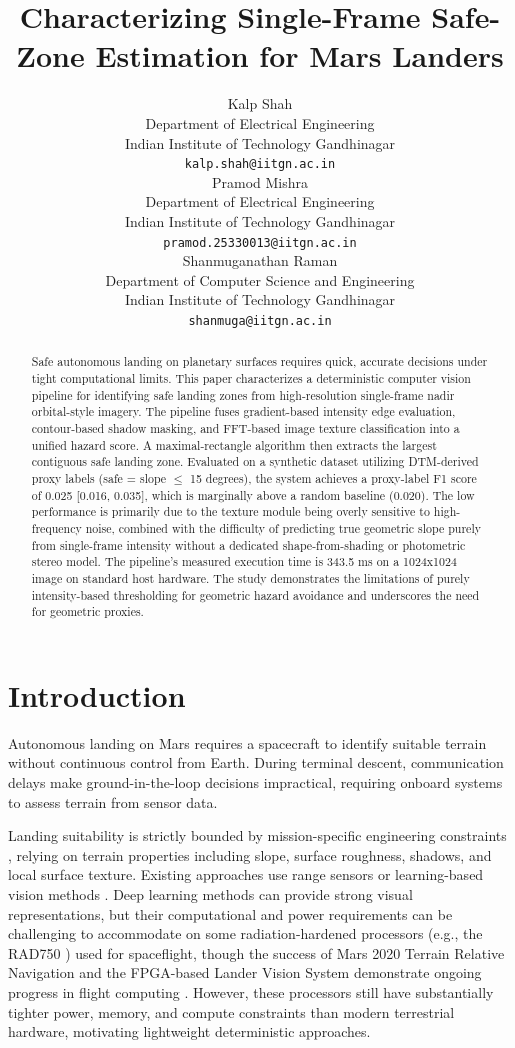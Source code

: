 \documentclass{article}
\title{Characterizing Single-Frame Safe-Zone Estimation for Mars Landers}
\author{
  Kalp Shah \\
  Department of Electrical Engineering \\
  Indian Institute of Technology Gandhinagar \\
  \texttt{kalp.shah@iitgn.ac.in} \\
   \And
  Pramod Mishra \\
  Department of Electrical Engineering \\
  Indian Institute of Technology Gandhinagar \\
  \texttt{pramod.25330013@iitgn.ac.in} \\
  \And
  Shanmuganathan Raman \\
  Department of Computer Science and Engineering \\
  Indian Institute of Technology Gandhinagar \\
  \texttt{shanmuga@iitgn.ac.in} \\
}
\begin{document}
\maketitle


\begin{abstract}
Safe autonomous landing on planetary surfaces requires quick, accurate decisions under tight computational limits. This paper characterizes a deterministic computer vision pipeline for identifying safe landing zones from high-resolution single-frame nadir orbital-style imagery. The pipeline fuses gradient-based intensity edge evaluation, contour-based shadow masking, and FFT-based image texture classification into a unified hazard score. A maximal-rectangle algorithm then extracts the largest contiguous safe landing zone. Evaluated on a synthetic dataset utilizing DTM-derived proxy labels (safe = slope $\le$ 15 degrees), the system achieves a proxy-label F1 score of 0.025 [0.016, 0.035], which is marginally above a random baseline (0.020). The low performance is primarily due to the texture module being overly sensitive to high-frequency noise, combined with the difficulty of predicting true geometric slope purely from single-frame intensity without a dedicated shape-from-shading or photometric stereo model. The pipeline's measured execution time is 343.5 ms on a 1024x1024 image on standard host hardware. The study demonstrates the limitations of purely intensity-based thresholding for geometric hazard avoidance and underscores the need for geometric proxies.
\end{abstract}




\section{Introduction}
Autonomous landing on Mars requires a spacecraft to identify suitable terrain without continuous control from Earth. During terminal descent, communication delays make ground-in-the-loop decisions impractical, requiring onboard systems to assess terrain from sensor data.

Landing suitability is strictly bounded by mission-specific engineering constraints \cite{golombek2012selection}, relying on terrain properties including slope, surface roughness, shadows, and local surface texture. Existing approaches use range sensors \cite{amzajerdian2013alhat} or learning-based vision methods \cite{moghe2020deep}. Deep learning methods can provide strong visual representations, but their computational and power requirements can be challenging to accommodate on some radiation-hardened processors (e.g., the RAD750 \cite{berger2001rad750}) used for spaceflight, though the success of Mars 2020 Terrain Relative Navigation and the FPGA-based Lander Vision System demonstrate ongoing progress in flight computing \cite{johnson2020mars2020}. However, these processors still have substantially tighter power, memory, and compute constraints than modern terrestrial hardware, motivating lightweight deterministic approaches.
\end{document}
